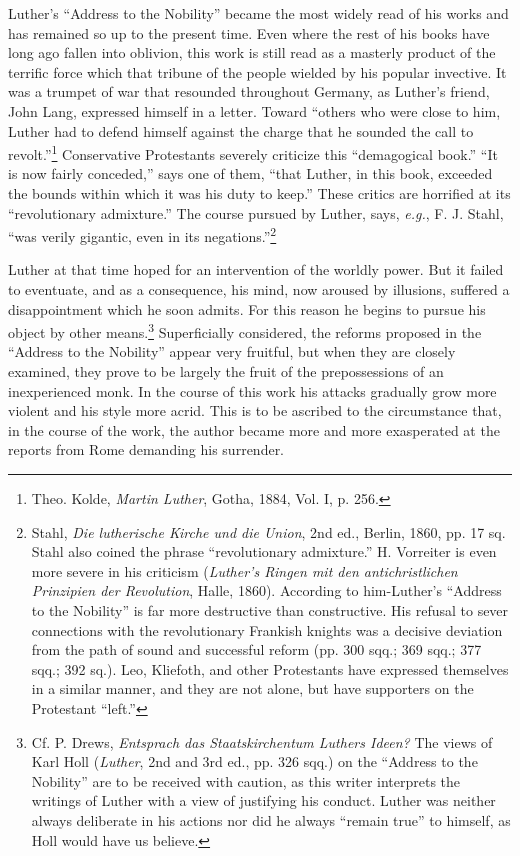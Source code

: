 Luther’s “Address to the Nobility” became the most widely read
of his works and has remained so up to the present time. Even where
the rest of his books have long ago fallen into oblivion, this work is
still read as a masterly product of the terrific force which that tribune
of the people wielded by his popular invective. It was a trumpet of
war that resounded throughout Germany, as Luther’s friend, John
Lang, expressed himself in a letter. Toward “others who were close
to him, Luther had to defend himself against the charge that he
sounded the call to revolt.”\footnote{Theo. Kolde, \textit{Martin Luther}, Gotha, 1884, Vol. I, p. 256.}
Conservative Protestants severely criticize this “demagogical book.” “It
is now fairly conceded,” says one
of them, “that Luther, in this book, exceeded the bounds within
which it was his duty to keep.” These critics are horrified at its “revolutionary
admixture.” The course pursued by Luther, says, \textit{e.g.},
F. J. Stahl, “was verily gigantic, even in its negations.”\footnote
{Stahl, \textit{Die lutherische Kirche und die Union}, 2nd ed., Berlin, 1860, pp. 17 sq. Stahl
also coined the phrase “revolutionary admixture.” H. Vorreiter is even more severe in his
criticism (\textit{Luther’s Ringen mit den antichristlichen Prinzipien der Revolution}, Halle,
1860). According to him-Luther’s “Address to the Nobility” is far more destructive than
constructive. His refusal to sever connections with the revolutionary Frankish knights
was a decisive deviation from the path of sound and successful reform (pp. 300 sqq.; 369
sqq.; 377 sqq.; 392 sq.). Leo, Kliefoth, and other Protestants have expressed themselves in a
similar manner, and they are not alone, but have supporters on the Protestant “left.”}

Luther at that time hoped for an intervention of the worldly
power. But it failed to eventuate, and as a consequence, his mind,
now aroused by illusions, suffered a disappointment which he soon
admits. For this reason he begins to pursue his object by other means.\footnote
{Cf. P. Drews, \textit{Entsprach das Staatskirchentum Luthers Ideen?} The views of Karl Holl
(\textit{Luther}, 2nd and 3rd ed., pp. 326 sqq.) on the “Address to the Nobility” are to be
received with caution, as this writer interprets the writings of Luther with a view of
justifying his conduct. Luther was neither always deliberate in his actions nor did he
always “remain true” to himself, as Holl would have us believe.}
Superficially considered, the reforms proposed in the “Address to the
Nobility” appear very fruitful, but when they are closely examined,
they prove to be largely the fruit of the prepossessions of an inexperienced
monk. In the course of this work his attacks gradually
grow more violent and his style more acrid. This is to be ascribed
to the circumstance that, in the course of the work, the author became
more and more exasperated at the reports from Rome demanding
his surrender.

